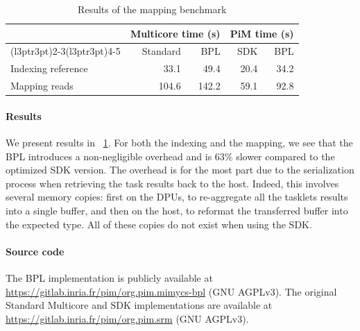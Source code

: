 \begin{table}[htbp]
    \centering
    \caption{Results of the mapping benchmark}
    \label{tab:mapping-results}
    \begin{tabular}{lrrrr}
    \toprule
     &\multicolumn{2}{c}{Multicore time (s)} & \multicolumn{2}{c}{PiM time (s)} \\
    \cmidrule(l{3pt}r{3pt}){2-3}\cmidrule(l{3pt}r{3pt}){4-5}
    & Standard & BPL & SDK & BPL \\
    \midrule
    Indexing reference & 33.1 & 49.4 & 20.4 & 34.2 \\
    Mapping reads & 104.6 & 142.2 & 59.1 & 92.8 \\
    \bottomrule
    \end{tabular}
\end{table}

\paragraph{Results} We present results in \tablename~\ref{tab:mapping-results}.
For both the indexing and the mapping, we see that the BPL introduces a non-negligible overhead and is 63\% slower compared to the optimized SDK version.
The overhead is for the most part due to the serialization process when retrieving the task results back to the host.
Indeed, this involves several memory copies: first on the DPUs, to re-aggregate all the tasklets results into a single buffer, and then on the host, to reformat the transferred buffer into the expected type.
All of these copies do not exist when using the SDK.

\paragraph{Source code} The BPL implementation is publicly available at \url{https://gitlab.inria.fr/pim/org.pim.mimycs-bpl} (GNU AGPLv3).
The original Standard Multicore and SDK implementations are available at \url{https://gitlab.inria.fr/pim/org.pim.srm} (GNU AGPLv3).